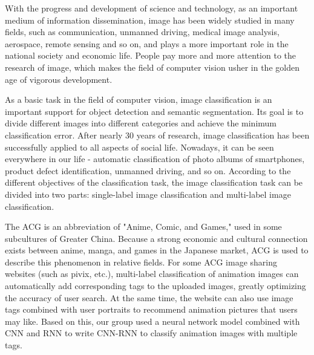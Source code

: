 \documentclass[10pt,twocolumn,letterpaper]{article}
\begin{document}
With the progress and development of science and technology, as an important medium of information dissemination, image has been widely studied in many fields, such as communication, unmanned driving, medical image analysis, aerospace, remote sensing and so on, and plays a more important role in the national society and economic life. People pay more and more attention to the research of image, which makes the field of computer vision usher in the golden age of vigorous development.\par
As a basic task in the field of computer vision, image classification is an important support for object detection and semantic segmentation. Its goal is to divide different images into different categories and achieve the minimum classification error. After nearly 30 years of research, image classification has been successfully applied to all aspects of social life. Nowadays, it can be seen everywhere in our life - automatic classification of photo albums of smartphones, product defect identification, unmanned driving, and so on.
According to the different objectives of the classification task, the image classification task can be divided into two parts: single-label image classification and multi-label image classification. \par
The ACG is an abbreviation of "Anime, Comic, and Games," used in some subcultures of Greater China. Because a strong economic and cultural connection exists between anime, manga, and games in the Japanese market, ACG is used to describe this phenomenon in relative fields. For some ACG image sharing websites (such as pivix, etc.), multi-label classification of animation images can automatically add corresponding tags to the uploaded images, greatly optimizing the accuracy of user search. At the same time, the website can also use image tags combined with user portraits to recommend animation pictures that users may like. Based on this, our group used a neural network model combined with CNN and RNN to write CNN-RNN to classify animation images with multiple tags.\par
\end{document}
